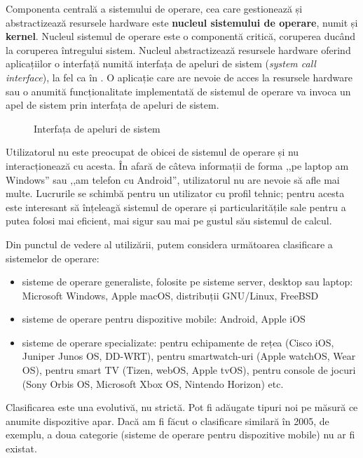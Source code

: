 Componenta centrală a sistemului de operare, cea care gestionează și abstractizează resursele hardware este \textbf{nucleul sistemului de operare}, numit și \textbf{kernel}.
Nucleul sistemul de operare este o componentă critică, coruperea ducând la coruperea întregului sistem.
Nucleul abstractizează resursele hardware oferind aplicațiilor o interfață numită interfața de apeluri de sistem (\textit{system call interface}), la fel ca în .
O aplicație care are nevoie de acces la resursele hardware sau o anumită funcționalitate implementată de sistemul de operare va invoca un apel de sistem prin interfața de apeluri de sistem.

\begin{figure}[htbp]
  \centering
  \def\svgwidth{\columnwidth}
  
  \caption{Interfața de apeluri de sistem}
  \label{fig:intro:syscall-interface}
\end{figure}

Utilizatorul nu este preocupat de obicei de sistemul de operare și nu interacționează cu acesta.
În afară de câteva informații de forma ,,pe laptop am Windows'' sau ,,am telefon cu Android'', utilizatorul nu are nevoie să afle mai multe.
Lucrurile se schimbă pentru un utilizator cu profil tehnic;
pentru acesta este interesant să înțeleagă sistemul de operare și particularitățile sale pentru a putea folosi mai eficient, mai sigur sau mai pe gustul său sistemul de calcul.

Din punctul de vedere al utilizării, putem considera următoarea clasificare a sistemelor de operare:

\begin{itemize}
  \item sisteme de operare generaliste, folosite pe sisteme server, desktop sau laptop: Microsoft Windows, Apple macOS, distribuții GNU/Linux, FreeBSD
  \item sisteme de operare pentru dispozitive mobile: Android, Apple iOS
  \item sisteme de operare specializate: pentru echipamente de rețea (Cisco iOS, Juniper Junos OS, DD-WRT), pentru smartwatch-uri (Apple watchOS, Wear OS), pentru smart TV (Tizen, webOS, Apple tvOS), pentru console de jocuri (Sony Orbis OS, Microsoft Xbox OS, Nintendo Horizon) etc.
\end{itemize}

Clasificarea este una evolutivă, nu strictă.
Pot fi adăugate tipuri noi pe măsură ce anumite dispozitive apar.
Dacă am fi făcut o clasificare similară în 2005, de exemplu, a doua categorie (sisteme de operare pentru dispozitive mobile) nu ar fi existat.


